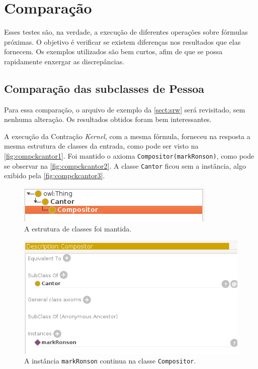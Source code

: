 \section{Comparação}

Esses testes são, na verdade, a execução de diferentes operações sobre fórmulas próximas. O objetivo é verificar se existem diferenças nos resultados que elas fornecem. Os exemplos utilizados são bem curtos, afim de que se possa rapidamente enxergar as discrepâncias.

\subsection{Comparação das subclasses de Pessoa}

Para essa comparação, o arquivo de exemplo da \autoref{sect:srw} será revisitado, sem nenhuma alteração. Os resultados obtidos foram bem interessantes.

A execução da Contração \textit{Kernel}, com a mesma fórmula, forneceu na resposta a mesma estrutura de classes da entrada, como pode ser visto na \autoref{fig:compckcantor1}. Foi mantido o axioma \texttt{Compositor(markRonson)}, como pode se observar na \autoref{fig:compckcantor2}. A classe \texttt{Cantor} ficou sem a instância, algo exibido pela \autoref{fig:compckcantor3}.

\begin{figure}[H]
	\centering
	\includegraphics[width=0.5\linewidth]{Capitulos/Testes/compckcantor1}
	\caption{A estrutura de classes foi mantida.}
	\label{fig:compckcantor1}
\end{figure}

\begin{figure}[H]
	\centering
	\includegraphics[width=0.5\linewidth]{Capitulos/Testes/compckcantor2}
	\caption{A instância \texttt{markRonson} continua na classe \texttt{Compositor}.}
	\label{fig:compckcantor2}
\end{figure}

